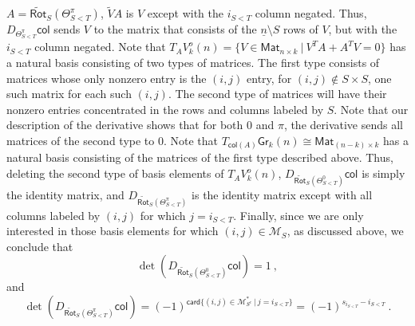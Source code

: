 \documentclass{article}
\newcommand{\mc}[1]{\mathcal{#1}}
\newcommand{\msf}[1]{\mathsf{#1}}
\newcommand{\gr}{\msf{Gr}}
\newcommand{\trot}{\widetilde{\msf{Rot}}}
\newcommand{\card}{\msf{card}}
\newcommand{\col}{\msf{col}}
\newcommand{\ul}[1]{\underline{#1}}
\theoremstyle{definition}
\begin{document}
$A = \trot_S(\Theta_{S<T}^\pi)$, $\widetilde{V}A$ is $V$ except with the $i_{S<T}$ column negated.
Thus, $D_{\Theta_{S<T}^\pi} \col$ sends $V$ to the matrix that consists of the $\ul{n}\setminus S$ rows of $V$, but
with the $i_{S<T}$ column negated. Note that 
$T_AV_k^o(n) = \{V \in \msf{Mat}_{n\times k} ~|~ V^TA+A^TV=0\}$ has a natural basis consisting of two types
of matrices. The first type consists of matrices whose only nonzero entry is the $(i,j)$ entry, for 
$(i,j) \not\in S \times S$, one such matrix for each such $(i,j)$. 
The second type of matrices will have their nonzero entries concentrated in the rows and columns labeled by $S$. 
Note that our description of the derivative shows that for both $0$ and $\pi$, the derivative sends all matrices of
the second type to 0. Note that $T_{\col(A)}\gr_k(n) \cong \msf{Mat}_{(n-k) \times k}$ has a natural
basis consisting of the matrices of the first type described above. Thus, deleting the second type of basis elements
of $T_AV_k^o(n)$, $D_{\trot_S(\Theta_{S<T}^0)}\col$ is simply the identity matrix, and 
$D_{\trot_S(\Theta_{S<T}^\pi)}$ is the identity matrix except with all columns labeled by $(i,j)$ for which 
$j=i_{S<T}$. Finally, since we are only interested in those basis elements for which $(i,j) \in \mc{M}_{S}$, 
as discussed above, we conclude that
$$\det(D_{\trot_S(\Theta_{S<T}^0)}\col) = 1~,$$
and
$$\det(D_{\trot_S(\Theta_{S<T}^\pi)}\col) = (-1)^{\card\{(i,j) \in \mc{M}_{S^c}^* ~|~ j=i_{S<T}\}}
    = (-1)^{s_{i_{S<T}}-i_{S<T}}~.$$
\end{document}
